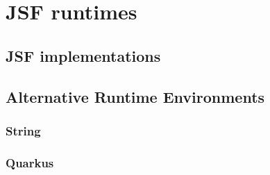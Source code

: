 %

\chapter{JSF runtimes}

\section{JSF implementations}

\section{Alternative Runtime Environments}

\subsection{String}

\subsection{Quarkus}



